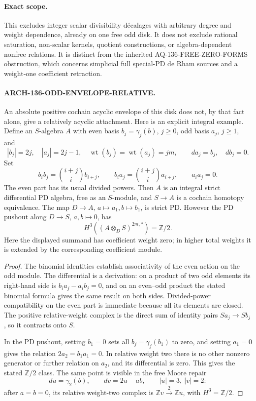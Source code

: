 \paragraph{Exact scope.}
This excludes integer scalar divisibility décalages with arbitrary degree and weight dependence, already on one free odd disk. It does not exclude rational saturation, non-scalar kernels, quotient constructions, or algebra-dependent nonfree relations. It is distinct from the inherited AQ-136-FREE-ZERO-FORMS obstruction, which concerns simplicial full special-PD de Rham sources and a weight-one coefficient retraction.

\paragraph{ARCH-136-ODD-ENVELOPE-RELATIVE.}
An absolute positive cochain acyclic envelope of this disk does not, by that fact alone, give a relatively acyclic attachment. Here is an explicit integral example. Define an \(S\)-algebra \(A\) with even basis \(b_j=\gamma_j(b)\), \(j\geq0\), odd basis \(a_j\), \(j\geq1\), and
\[
 |b_j|=2j,\quad |a_j|=2j-1,\quad
 \operatorname{wt}(b_j)=\operatorname{wt}(a_j)=jm,
 \qquad da_j=b_j,\quad db_j=0.
\]
Set
\[
 b_i b_j=\binom{i+j}{i}b_{i+j},\qquad
 b_i a_j=\binom{i+j}{i}a_{i+j},\qquad
 a_i a_j=0.
\]
The even part has its usual divided powers. Then \(A\) is an integral strict differential PD algebra, free as an \(S\)-module, and \(S\to A\) is a cochain homotopy equivalence. The map \(D\to A\), \(a\mapsto a_1,b\mapsto b_1\), is strict PD. However the PD pushout along \(D\to S\), \(a,b\mapsto0\), has
\[
              H^3((A\otimes_D S)^{2m,*})
                        = \mathbb Z/2 .
\]
Here the displayed summand has coefficient weight zero; in higher total weights it is extended by the corresponding coefficient module.

\begin{proof}
The binomial identities establish associativity of the even action on the odd module. The differential is a derivation: on a product of two odd elements its right-hand side is
\(b_i a_j-a_i b_j=0\), and on an even--odd product the stated binomial formula gives the same result on both sides. Divided-power compatibility on the even part is immediate because all its elements are closed. The positive relative-weight complex is the direct sum of identity pairs \(Sa_j\to Sb_j\), so it contracts onto \(S\).

In the PD pushout, setting \(b_1=0\) sets all \(b_j=\gamma_j(b_1)\) to zero, and setting \(a_1=0\) gives the relation
\(2a_2=b_1a_1=0\). In relative weight two there is no other nonzero generator or further relation on \(a_2\), and its differential is zero. This gives the stated \(\mathbb Z/2\) class. The same point is visible in the free Moore repair
\[
 du=\gamma_2(b),\qquad dv=2u-ab,\qquad |u|=3,\ |v|=2:
\]
after \(a=b=0\), its relative weight-two complex is
\(\mathbb Z v\xrightarrow{2}\mathbb Z u\), with \(H^3=\mathbb Z/2\).
\end{proof}

